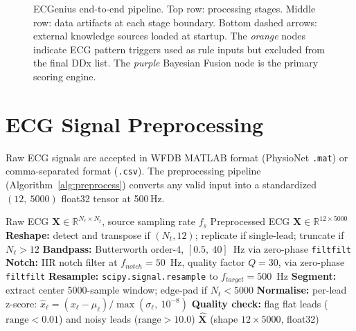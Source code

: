 \documentclass[journal]{IEEEtran}
\begin{document}
\begin{figure}[!t]
\caption{ECGenius end-to-end pipeline. Top row: processing stages.
Middle row: data artifacts at each stage boundary.
Bottom dashed arrows: external knowledge sources loaded at startup.
The \textit{orange} nodes indicate ECG pattern triggers used as
rule inputs but excluded from the final DDx list.
The \textit{purple} Bayesian Fusion node is the primary scoring engine.}
\label{fig:pipeline}
\end{figure}

\section{ECG Signal Preprocessing}
\label{sec:preprocess}

Raw ECG signals are accepted in WFDB MATLAB format (PhysioNet
\texttt{.mat}) or comma-separated format (\texttt{.csv}).
The preprocessing pipeline (Algorithm~\ref{alg:preprocess}) converts
any valid input into a standardized $(\textit{12},\ 5000)$
float32 tensor at 500\,Hz.

\begin{algorithm}[t]
\caption{ECG Preprocessing Pipeline}
\label{alg:preprocess}
\begin{algorithmic}[1]
  \REQUIRE Raw ECG $\mathbf{X} \in \mathbb{R}^{N_\ell \times N_t}$,
           source sampling rate $f_s$
  \ENSURE  Preprocessed ECG $\hat{\mathbf{X}} \in \mathbb{R}^{12 \times 5000}$
  \STATE   \textbf{Reshape:} detect and transpose if $(N_t, 12)$;
           replicate if single-lead; truncate if $N_\ell > 12$
  \STATE   \textbf{Bandpass:} Butterworth order-4, $[0.5,\ 40]$~Hz
           via zero-phase \texttt{filtfilt}
  \STATE   \textbf{Notch:} IIR notch filter at $f_{notch}=50$~Hz,
           quality factor $Q=30$, via zero-phase \texttt{filtfilt}
  \STATE   \textbf{Resample:} \texttt{scipy.signal.resample} to
           $f_{target}=500$~Hz
  \STATE   \textbf{Segment:} extract center 5000-sample window;
           edge-pad if $N_t < 5000$
  \STATE   \textbf{Normalise:} per-lead z-score:
           $\hat{x}_\ell = (x_\ell - \mu_\ell)
           / \max(\sigma_\ell,\ 10^{-8})$
  \STATE   \textbf{Quality check:} flag flat leads
           ($\text{range} < 0.01$) and noisy leads
           ($\text{range} > 10.0$)
  \RETURN  $\hat{\mathbf{X}}$ (shape $12 \times 5000$, float32)
\end{algorithmic}
\end{algorithm}
\end{document}
